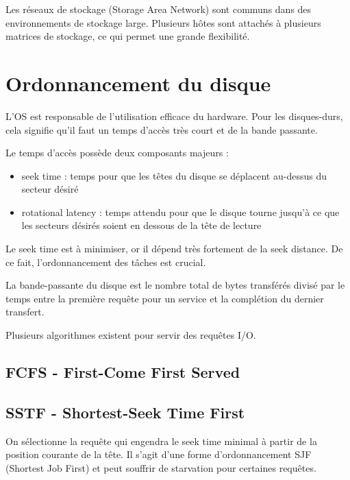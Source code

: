 	Les réseaux de stockage (Storage Area Network) sont communs dans des environnements de stockage large. Plusieurs hôtes sont attachés à plusieurs matrices de stockage, ce qui permet une grande flexibilité.
	
	
\section{Ordonnancement du disque}
	
L'OS est responsable de l'utilisation efficace du hardware. Pour les disques-durs, cela signifie qu'il faut un temps d'accès très court et de la bande passante.

Le temps d'accès possède deux composants majeurs :

\begin{itemize}
	\item seek time : temps pour que les têtes du disque se déplacent au-dessus du secteur désiré
	\item rotational latency : temps attendu pour que le disque tourne jusqu'à ce que les secteurs désirés soient en dessous de la tête de lecture
\end{itemize}

Le seek time est à minimiser, or il dépend très fortement de la seek distance. De ce fait, l'ordonnancement des tâches est crucial.

La bande-passante du disque est le nombre total de bytes transférés divisé par le temps entre la première requête pour un service et la complétion du dernier transfert.

Plusieurs algorithmes existent pour servir des requêtes I/O.

	\subsection{FCFS - First-Come First Served}
	
	
	\subsection{SSTF - Shortest-Seek Time First}
	
	On sélectionne la requête qui engendra le seek time minimal à partir de la position courante de la tête. Il s'agit d'une forme d'ordonnancement SJF (Shortest Job First) et peut souffrir de starvation pour certaines requêtes.
		
